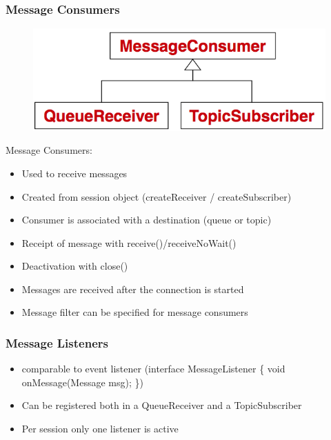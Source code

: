\documentclass[10pt]{article}
\begin{document}
\subsubsection{Message Consumers}
\begin{figure}
	\centering
	\includegraphics[scale=0.2]{jms-api-message-consumer.png}%
\end{figure}
Message Consumers:
\begin{itemize}
	\item Used to receive messages
	\item Created from session object (createReceiver / createSubscriber)
	\item Consumer is associated with a destination (queue or topic)
	\item Receipt of message with receive()/receiveNoWait()
	\item Deactivation with close()
	\item Messages are received after the connection is started
	\item Message filter can be specified for message consumers
\end{itemize}
\subsubsection{Message Listeners}
\begin{itemize}
	\item comparable to event listener (interface MessageListener \{ void onMessage(Message msg); \})
	\item Can be registered both in a QueueReceiver and a TopicSubscriber
	\item Per session only one listener is active
\end{itemize}
\end{document}
